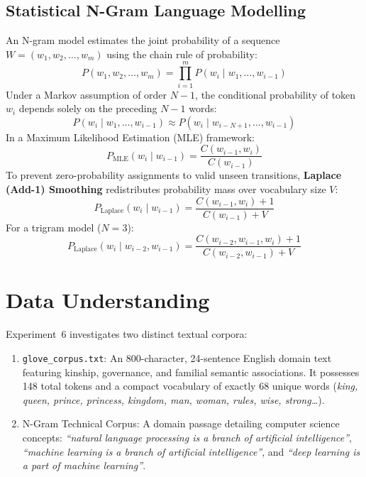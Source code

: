 \documentclass[12pt,a4paper]{report}
\begin{document}
\subsection{Statistical N-Gram Language Modelling}
An N-gram model estimates the joint probability of a sequence $W = (w_1, w_2, \dots, w_m)$ using the chain rule of probability:
\begin{equation}
    P(w_1, w_2, \dots, w_m) = \prod_{i=1}^{m} P(w_i \mid w_1, \dots, w_{i-1})
\end{equation}
Under a Markov assumption of order $N-1$, the conditional probability of token $w_i$ depends solely on the preceding $N-1$ words:
\begin{equation}
    P(w_i \mid w_1, \dots, w_{i-1}) \approx P(w_i \mid w_{i-N+1}, \dots, w_{i-1})
\end{equation}
In a Maximum Likelihood Estimation (MLE) framework:
\begin{equation}
    P_{\text{MLE}}(w_i \mid w_{i-1}) = \frac{C(w_{i-1}, w_i)}{C(w_{i-1})}
\end{equation}
To prevent zero-probability assignments to valid unseen transitions, \textbf{Laplace (Add-1) Smoothing} redistributes probability mass over vocabulary size $V$:
\begin{equation}
    P_{\text{Laplace}}(w_i \mid w_{i-1}) = \frac{C(w_{i-1}, w_i) + 1}{C(w_{i-1}) + V}
\end{equation}
For a trigram model ($N=3$):
\begin{equation}
    P_{\text{Laplace}}(w_i \mid w_{i-2}, w_{i-1}) = \frac{C(w_{i-2}, w_{i-1}, w_i) + 1}{C(w_{i-2}, w_{i-1}) + V}
\end{equation}

\section{Data Understanding}
Experiment~6 investigates two distinct textual corpora:
\begin{enumerate}
    \item \texttt{glove\_corpus.txt}: An 800-character, 24-sentence English domain text featuring kinship, governance, and familial semantic associations. It possesses 148 total tokens and a compact vocabulary of exactly 68 unique words (\textit{king, queen, prince, princess, kingdom, man, woman, rules, wise, strong\dots}).
    \item N-Gram Technical Corpus: A domain passage detailing computer science concepts: \textit{``natural language processing is a branch of artificial intelligence''}, \textit{``machine learning is a branch of artificial intelligence''}, and \textit{``deep learning is a part of machine learning''}.
\end{enumerate}
\end{document}
